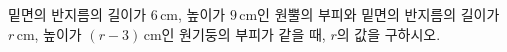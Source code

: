 밑면의 반지름의 길이가 $6\,\mathrm{cm}$, 높이가 $9\,\mathrm{cm}$인 원뿔의 부피와 밑면의 반지름의 길이가 $r\,\mathrm{cm}$, 높이가 $(r-3)\,\mathrm{cm}$인 원기둥의 부피가 같을 때, $r$의 값을 구하시오.

